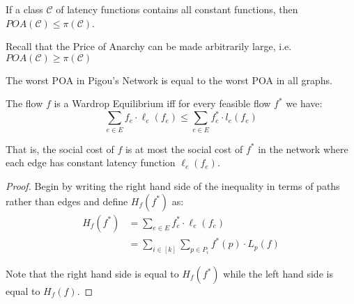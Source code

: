 \begin{theorem}
	If a class $\mathcal{C}$ of latency functions contains all constant
	functions, then $POA(\mathcal{C}) \le \pi(\mathcal{C})$.
\end{theorem}

Recall that the Price of Anarchy can be made arbitrarily large, i.e.
$POA(\mathcal{C}) \ge \pi(\mathcal{C})$

\begin{corollary}
	The worst POA in Pigou's Network is equal to the worst POA in all graphs.
\end{corollary}

\begin{theorem}
	The flow $f$ is a Wardrop Equilibrium iff for every feasible flow $f^*$ we
	have:
	\begin{equation}
		\sum_{e \in E} f_e \cdot \ell_e(f_e) \le \sum_{e \in E} f^*_e \cdot
		l_e(f_e)
	\end{equation}

	That is, the social cost of $f$ is at most the social cost of $f^*$ in the
	network where each edge has constant latency function $\ell_e(f_e)$.
\end{theorem}
\begin{proof}
	Begin by writing the right hand side of the inequality in terms of paths
	rather than edges and define $H_f(f^*)$ as:
	\begin{equation*}
		\begin{split}
			H_f(f^*) & = \sum_{e \in E} f^*_e \cdot \ell_e(f_e) \\
			& = \sum_{i \in [k]} \sum_{p \in P_i} f^*(p) \cdot L_p(f)
		\end{split}
	\end{equation*}

	Note that the right hand side is equal to $H_f(f^*)$ while the left hand
	side is equal to $H_f(f)$.
\end{proof}
